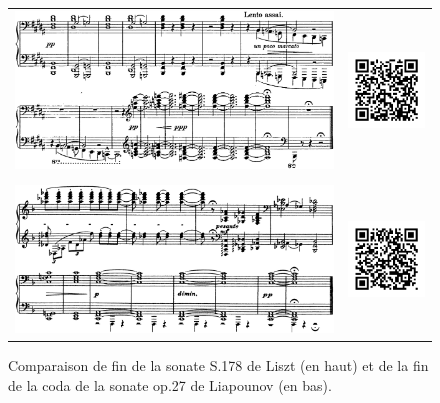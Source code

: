 \begin{figure}[!p]
  \begin{bigcenter}
    \begin{tabular}{lr}
      \vspace*{0.0cm}
      \includegraphics[width=12.5cm, keepaspectratio]{sonate-liszt-fin.png}
      &
      \includegraphics[width=3cm, keepaspectratio]{sonate-liszt-fin-qr.png}
      \\
      \vspace{0.5cm} &
      \\
      \includegraphics[width=12.5cm, keepaspectratio]{sonate-fin.png}
      &
      \includegraphics[width=3cm, keepaspectratio]{sonate-qr.png}
    \end{tabular}
  \end{bigcenter}
  \caption{\label{sonate-fin}Comparaison de fin de la sonate S.178 de Liszt (en haut) et de la fin de la coda de la sonate op.27 de Liapounov (en bas).}
\end{figure}


